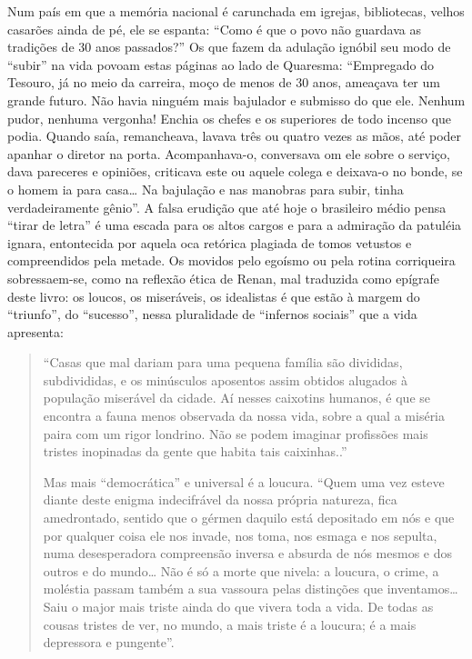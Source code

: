 \documentclass[
  letterpaper,
  DIV=11,
  numbers=noendperiod]{scrreprt}
\begin{document}
Num país em que a memória nacional é carunchada em igrejas, bibliotecas,
velhos casarões ainda de pé, ele se espanta: ``Como é que o povo não
guardava as tradições de 30 anos passados?'' Os que fazem da adulação
ignóbil seu modo de ``subir'' na vida povoam estas páginas ao lado de
Quaresma: ``Empregado do Tesouro, já no meio da carreira, moço de menos
de 30 anos, ameaçava ter um grande futuro. Não havia ninguém mais
bajulador e submisso do que ele. Nenhum pudor, nenhuma vergonha! Enchia
os chefes e os superiores de todo incenso que podia. Quando saía,
remancheava, lavava três ou quatro vezes as mãos, até poder apanhar o
diretor na porta. Acompanhava-o, conversava om ele sobre o serviço, dava
pareceres e opiniões, criticava este ou aquele colega e deixava-o no
bonde, se o homem ia para casa\ldots{} Na bajulação e nas manobras para
subir, tinha verdadeiramente gênio''. A falsa erudição que até hoje o
brasileiro médio pensa ``tirar de letra'' é uma escada para os altos
cargos e para a admiração da patuléia ignara, entontecida por aquela oca
retórica plagiada de tomos vetustos e compreendidos pela metade. Os
movidos pelo egoísmo ou pela rotina corriqueira sobressaem-se, como na
reflexão ética de Renan, mal traduzida como epígrafe deste livro: os
loucos, os miseráveis, os idealistas é que estão à margem do
``triunfo'', do ``sucesso'', nessa pluralidade de ``infernos sociais''
que a vida apresenta:

\begin{quote}
``Casas que mal dariam para uma pequena família são divididas,
subdivididas, e os minúsculos aposentos assim obtidos alugados à
população miserável da cidade. Aí nesses caixotins humanos, é que se
encontra a fauna menos observada da nossa vida, sobre a qual a miséria
paira com um rigor londrino. Não se podem imaginar profissões mais
tristes inopinadas da gente que habita tais caixinhas..''~

Mas mais ``democrática'' e universal é a loucura. ``Quem uma vez esteve
diante deste enigma indecifrável da nossa própria natureza, fica
amedrontado, sentido que o gérmen daquilo está depositado em nós e que
por qualquer coisa ele nos invade, nos toma, nos esmaga e nos sepulta,
numa desesperadora compreensão inversa e absurda de nós mesmos e dos
outros e do mundo\ldots{} Não é só a morte que nivela: a loucura, o
crime, a moléstia passam também a sua vassoura pelas distinções que
inventamos\ldots{} Saiu o major mais triste ainda do que vivera toda a
vida. De todas as cousas tristes de ver, no mundo, a mais triste é a
loucura; é a mais depressora e pungente''.
\end{quote}
\end{document}
